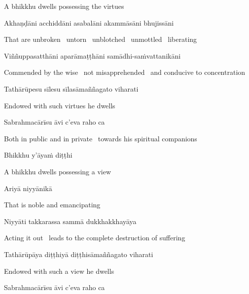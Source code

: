\begin{english}
  A bhikkhu dwells possessing the virtues
\end{english}

Akhaṇḍāni acchiddāni asabalāni akammāsāni bhujissāni

\begin{english}
  That are unbroken \breathmark\ untorn \breathmark\ unblotched \breathmark\ unmottled \breathmark\ liberating
\end{english}

Viññuppasatthāni aparāmaṭṭhāni samādhi-saṁvattanikāni

\begin{english-hang}
  Commended by the wise \breathmark\ not misapprehended \breathmark\ and conducive to concentration
\end{english-hang}

Tathārūpesu sīlesu sīlasāmaññagato viharati

\begin{english}
  Endowed with such virtues he dwells
\end{english}

Sabrahmacārīsu āvi c'eva raho ca

\begin{english}
  Both in public and in private \breathmark\ towards his spiritual companions
\end{english}

Bhikkhu y'āyaṁ diṭṭhi

\begin{english}
  A bhikkhu dwells possessing a view
\end{english}

Ariyā niyyānikā

\begin{english}
  That is noble and emancipating
\end{english}

Niyyāti takkarassa sammā dukkhakkhayāya

\begin{english}
  Acting it out \breathmark\ leads to the complete destruction of suffering
\end{english}

Tathārūpāya diṭṭhiyā diṭṭhisāmaññagato viharati

\begin{english}
  Endowed with such a view he dwells
\end{english}

Sabrahmacārīsu āvi c'eva raho ca

